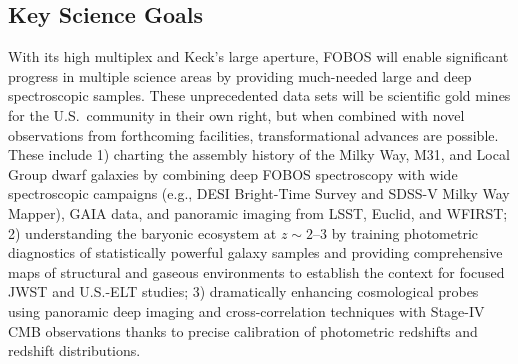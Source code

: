 

\subsection{Key Science Goals}

With its high multiplex and Keck's large aperture, FOBOS will enable significant progress in multiple science areas by providing much-needed large and deep spectroscopic samples.  These unprecedented data sets will be scientific gold mines for the U.S.~community in their own right, but when combined with novel observations from forthcoming facilities, transformational advances are possible.  These include 1) charting the assembly history of the Milky Way, M31, and Local Group dwarf galaxies by combining deep FOBOS spectroscopy with wide spectroscopic campaigns (e.g., DESI Bright-Time Survey and SDSS-V Milky Way Mapper), GAIA data, and panoramic imaging from LSST, Euclid, and WFIRST; 2) understanding the baryonic ecosystem at $z \sim 2$--3 by training photometric diagnostics of statistically powerful galaxy samples and providing comprehensive maps of structural and gaseous environments to establish the context for focused JWST and U.S.-ELT studies; 3) dramatically enhancing cosmological probes using panoramic deep imaging and cross-correlation techniques with Stage-IV CMB observations thanks to precise calibration of photometric redshifts and redshift distributions.  


